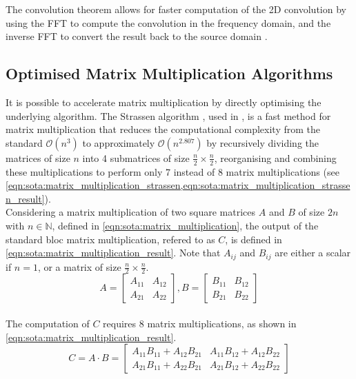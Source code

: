 \noindent The convolution theorem allows for faster computation of the 2D
convolution by using the \ac{FFT} to compute the convolution in the frequency
domain, and the inverse \ac{FFT} to convert the result back to the source domain
\cite{oppenheim1997signals}.

\subsection{Optimised Matrix Multiplication Algorithms}\label{sec:sota:matrix_multiplication}

It is possible to accelerate matrix multiplication by directly optimising the
underlying algorithm. The  Strassen algorithm \cite{strassen1969gaussian}, used
in \cite{DBLP:conf/icann/CongX14}, is a fast method for matrix multiplication
that reduces the computational complexity from the standard $\mathcal{O}(n^{3})$
to approximately $\mathcal{O}(n^{2.807})$ by recursively dividing the matrices
of size $n$ into 4 submatrices of size $\frac{n}{2} \times \frac{n}{2}$,
reorganising and combining these multiplications to perform only 7 instead of 8
matrix multiplications (see
\cref{eqn:sota:matrix_multiplication_strassen,eqn:sota:matrix_multiplication_strassen_result}).\\

Considering a matrix multiplication of two square matrices $A$ and $B$ of size
$2n$ with $n\in\mathbb{N}$, defined in \cref{eqn:sota:matrix_multiplication},
the output of the standard bloc matrix multiplication, refered to as $C$, is
defined in \cref{eqn:sota:matrix_multiplication_result}. Note that $A_{ij}$ and
$B_{ij}$ are either a scalar if $n=1$, or a matrix of size $\frac{n}{2} \times
  \frac{n}{2}$.\\

\begin{equation}
  \label{eqn:sota:matrix_multiplication}
  A = \begin{bmatrix} A_{11} & A_{12} \\ A_{21} & A_{22} \end{bmatrix},
  B = \begin{bmatrix} B_{11} & B_{12} \\ B_{21} & B_{22} \end{bmatrix}
\end{equation}\\

\noindent The computation of $C$ requires 8 matrix multiplications, as shown in
\cref{eqn:sota:matrix_multiplication_result}.\\
\begin{equation}
  \label{eqn:sota:matrix_multiplication_result}
  C = A \cdot B = \begin{bmatrix} A_{11}B_{11} + A_{12}B_{21} & A_{11}B_{12} + A_{12}B_{22} \\ A_{21}B_{11} + A_{22}B_{21} & A_{21}B_{12} + A_{22}B_{22} \end{bmatrix}
\end{equation}\\

